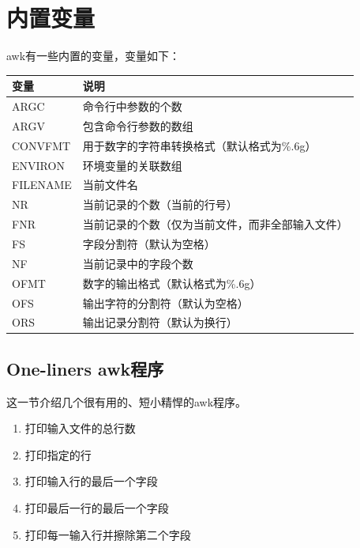 \section{内置变量}

awk有一些内置的变量，变量如下：

\begin{table}[!h]
  \begin{center}
    \begin{tabular}{l|l}
      \hline
      变量     & 说明 \\
      \hline
      ARGC        & 命令行中参数的个数 \\
      \hline
      ARGV        & 包含命令行参数的数组 \\
      \hline
      CONVFMT     & 用于数字的字符串转换格式（默认格式为\%.6g） \\
      \hline
      ENVIRON     & 环境变量的关联数组 \\
      \hline
      FILENAME    & 当前文件名 \\
      \hline
      NR          & 当前记录的个数（当前的行号） \\
      \hline
      FNR         &  当前记录的个数（仅为当前文件，而非全部输入文件） \\
      \hline
      FS          & 字段分割符（默认为空格） \\
      \hline
      NF          & 当前记录中的字段个数 \\
      \hline 
      OFMT        & 数字的输出格式（默认格式为\%.6g） \\
      \hline
      OFS         & 输出字符的分割符（默认为空格） \\
      \hline
      ORS         & 输出记录分割符（默认为换行） \\
      \hline
    \end{tabular}
  \end{center}
\end{table}

\subsection{One-liners awk程序}

这一节介绍几个很有用的、短小精悍的awk程序。

\begin{enumerate}
\item 打印输入文件的总行数
\item 打印指定的行
\item 打印输入行的最后一个字段
\item 打印最后一行的最后一个字段
\item 打印每一输入行并擦除第二个字段
\end{enumerate}

